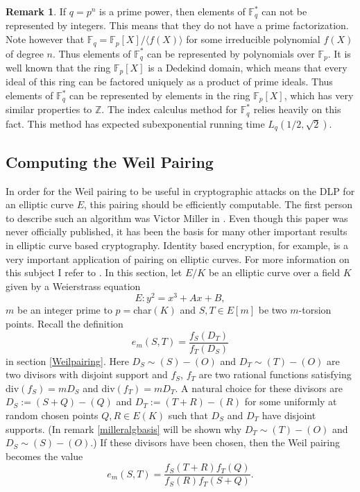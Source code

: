 \documentclass{article}
\numberwithin{equation}{section}
\theoremstyle{definition}
\newtheorem{remark}[theorem]{Remark}
\newcommand{\ZZ}{{\mathbb Z}} %
\newcommand{\FF}[1]{{\mathbb F}_{#1}} %
\newcommand{\grgen}[1]{\langle #1 \rangle} %
\begin{document}
\begin{remark}
If $q=p^n$ is a prime power, then elements of $\FF{q}^*$ can not be represented by integers. This means that they do not have a prime factorization. Note however that $\FF{q}=\FF{p}[X]/\grgen{f(X)}$ for some irreducible polynomial $f(X)$ of degree $n$. Thus elements of $\FF{q}^*$ can be represented by polynomials over $\FF{p}$. It is well known that the ring $\FF{p}[X]$ is a Dedekind domain, which means that every ideal of this ring can be factored uniquely as a product of prime ideals. Thus elements of $\FF{q}^*$ can be represented by elements in the ring $\FF{p}[X]$, which has very similar properties to $\ZZ$. The index calculus method for $\FF{q}^*$ relies heavily on this fact. This method has expected subexponential running time $L_q(1/2,\sqrt{2})$.
\end{remark}





\subsection{Computing the Weil Pairing}\label{calcWP}
In order for the Weil pairing to be useful in cryptographic attacks on the DLP for an elliptic curve $E$, this pairing should be efficiently computable. The first person to describe such an algorithm was Victor Miller in \cite{Millerunpublished}. Even though this paper was never officially published, it has been the basis for many other important results in elliptic curve based cryptography. Identity based encryption, for example, is a very important application of pairing on elliptic curves. For more information on this subject I refer to \cite{idcryptography}. In this section, let $E/K$ be an elliptic curve over a field $K$ given by a Weierstrass equation 
$$E:y^2 = x^3+Ax+B,$$ 
$m$ be an integer prime to $p=$char$(K)$ and $S,T \in E[m]$ be two $m$-torsion points. Recall the definition 
$$e_m(S,T)=\frac{f_S(D_T)}{f_T(D_S)}$$ 
in section \ref{Weilpairing}. Here $D_S\sim (S)-(O)$ and $D_T \sim (T)-(O)$ are two divisors with disjoint support and $f_S$, $f_T$ are two rational functions satisfying div$(f_S)=mD_S$ and div$(f_T)=mD_T$. A natural choice for these divisors are $D_S:=(S+Q)-(Q)$ and $D_T:=(T+R)-(R)$ for some uniformly at random chosen points $Q,R \in E(K)$ such that $D_S$ and $D_T$ have disjoint supports. (In remark \ref{milleralgbasis} will be shown why $D_T \sim (T)-(O)$ and $D_S \sim (S)-(O)$.) If these divisors have been chosen, then the Weil pairing becomes the value 
\begin{equation}\label{wpcomputable}e_m(S,T)=\frac{f_S(T+R)f_T(Q)}{f_S(R)f_T(S+Q)}.\end{equation} 
\end{document}
